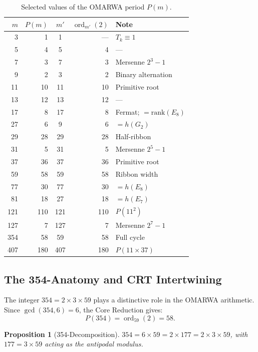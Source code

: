 \documentclass[11pt, a4paper]{article}
\theoremstyle{plain}
\newtheorem{proposition}[theorem]{Proposition}
\theoremstyle{definition}
\theoremstyle{remark}
\newcommand{\ord}{\operatorname{ord}}
\begin{document}
\begin{table}[H]
\centering
\caption{Selected values of the OMARWA period $P(m)$.}\label{tab:periods}
\smallskip
\begin{tabular}{@{}rrcrl@{}}
\toprule
$m$ & $P(m)$ & $m'$ & $\ord_{m'}(2)$ & Note \\
\midrule
3  & 1  & 1  & ---  & $T_k \equiv 1$ \\
5  & 4  & 5  & 4    & --- \\
7  & 3  & 7  & 3    & Mersenne $2^3 - 1$ \\
9  & 2  & 3  & 2    & Binary alternation \\
11 & 10 & 11 & 10   & Primitive root \\
13 & 12 & 13 & 12   & --- \\
17 & 8  & 17 & 8    & Fermat; $= \mathrm{rank}(E_8)$ \\
27 & 6  & 9  & 6    & $= h(G_2)$ \\
29 & 28 & 29 & 28   & Half-ribbon \\
31 & 5  & 31 & 5    & Mersenne $2^5 - 1$ \\
37 & 36 & 37 & 36   & Primitive root \\
59 & 58 & 59 & 58   & Ribbon width \\
77 & 30 & 77 & 30   & $= h(E_8)$ \\
81 & 18 & 27 & 18   & $= h(E_7)$ \\
121 & 110 & 121 & 110 & $P(11^2)$ \\
127 & 7  & 127 & 7   & Mersenne $2^7 - 1$ \\
354 & 58 & 59  & 58  & Full cycle \\
407 & 180 & 407 & 180 & $P(11 \times 37)$ \\
\bottomrule
\end{tabular}
\end{table}

\subsection{The 354-Anatomy and CRT Intertwining}\label{sec:354}

The integer $354 = 2 \times 3 \times 59$ plays a distinctive role in
the OMARWA arithmetic. Since $\gcd(354, 6) = 6$, the Core Reduction
gives:
\[
  P(354) = \ord_{59}(2) = 58.
\]

\begin{proposition}[354-Decomposition]\label{prop:354}
$354 = 6 \times 59 = 2 \times 177 = 2 \times 3 \times 59$, with
$177 = 3 \times 59$ acting as the antipodal modulus.
\end{proposition}
\end{document}
